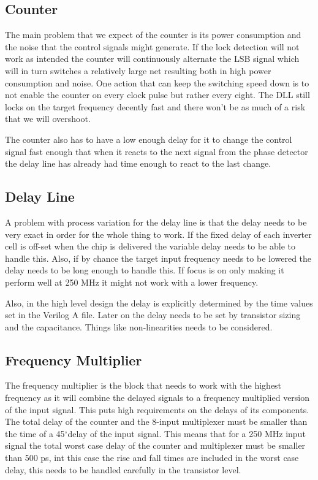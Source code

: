 \documentclass[a4paper,12pt]{article} \usepackage{graphicx}
\newcommand{\degree}{\ensuremath{^\circ}}
\begin{document}
\subsection{Counter}
The main problem that we expect of the counter is its power consumption and the
noise that the control signals might generate.
If the lock detection will not work as intended the counter will continuously
alternate the LSB signal which will in turn switches a relatively large net
resulting both in high power consumption and noise.
One action that can keep the switching speed down is to not enable the counter
on every clock pulse but rather every eight. The DLL still locks on the target
frequency decently fast and there won't be as much of a risk that we will 
overshoot.

The counter also has to have a low enough delay for it to change the control
signal fast enough that when it reacts to the next signal from the phase 
detector the delay line has already had time enough to react to the last change.
\subsection{Delay Line}
A problem with process variation for the delay line is that the delay
needs to be very exact in order for the whole thing to work. If the
fixed delay of each inverter cell is off-set when the chip is
delivered the variable delay needs to be able to handle this. Also,
if by chance the target input frequency needs to be lowered the delay
needs to be long enough to handle this. If focus is on only making it
perform well at 250 MHz it might not work with a lower frequency. 

Also, in the high level design the delay is explicitly determined by
the time values set in the Verilog A file. Later on the delay needs to
be set by transistor sizing and the capacitance. Things like
non-linearities needs to be considered.

\subsection{Frequency Multiplier}
The frequency multiplier is the block that needs to work with the highest 
frequency as it will combine the delayed signals to a frequency multiplied 
version of the input signal. This puts high requirements on the delays of its
components. The total delay of the counter and the 8-input multiplexer
must be smaller than the time of a 45\degree  delay of the input signal.
This means that for a 250 MHz input signal the total worst case delay of the
counter and multiplexer must be smaller than 500 ps, int this case the rise
 and fall times are included in the worst case delay, this needs to be handled
carefully in the transistor level.
\end{document}
